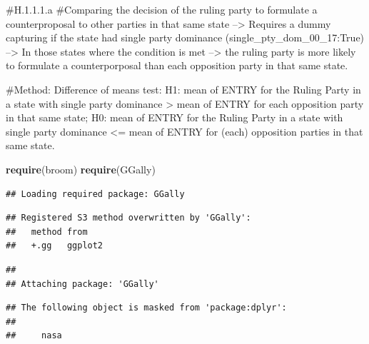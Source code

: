 \documentclass[]{article}
\newenvironment{Shaded}{\begin{snugshade}}{\end{snugshade}}
\newcommand{\DataTypeTok}[1]{\textcolor[rgb]{0.13,0.29,0.53}{#1}}
\newcommand{\KeywordTok}[1]{\textcolor[rgb]{0.13,0.29,0.53}{\textbf{#1}}}
\newcommand{\NormalTok}[1]{#1}
\newcommand{\OperatorTok}[1]{\textcolor[rgb]{0.81,0.36,0.00}{\textbf{#1}}}
\newcommand{\StringTok}[1]{\textcolor[rgb]{0.31,0.60,0.02}{#1}}
\begin{document}
\#H.1.1.1.a \#Comparing the decision of the ruling party to formulate a
counterproposal to other parties in that same state --\textgreater{}
Requires a dummy capturing if the state had single party dominance
(single\_pty\_dom\_00\_17:True) --\textgreater{} In those states where
the condition is met --\textgreater{} the ruling party is more likely to
formulate a counterporposal than each opposition party in that same
state.

\#Method: Difference of means test: H1: mean of ENTRY for the Ruling
Party in a state with single party dominance \textgreater{} mean of
ENTRY for each opposition party in that same state; H0: mean of ENTRY
for the Ruling Party in a state with single party dominance \textless{}=
mean of ENTRY for (each) opposition parties in that same state.

\begin{Shaded}
\begin{Highlighting}[]
\KeywordTok{require}\NormalTok{(broom)}
\KeywordTok{require}\NormalTok{(GGally)}
\end{Highlighting}
\end{Shaded}

\begin{verbatim}
## Loading required package: GGally
\end{verbatim}

\begin{verbatim}
## Registered S3 method overwritten by 'GGally':
##   method from   
##   +.gg   ggplot2
\end{verbatim}

\begin{verbatim}
## 
## Attaching package: 'GGally'
\end{verbatim}

\begin{verbatim}
## The following object is masked from 'package:dplyr':
## 
##     nasa
\end{verbatim}

\begin{Shaded}
\end{Shaded}
\end{document}

